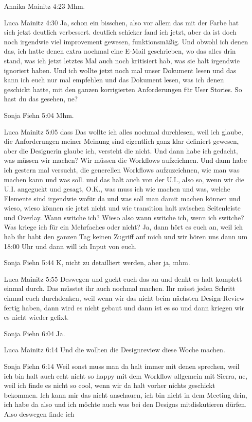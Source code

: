 Annika Mainitz   4:23
Mhm.

Luca Mainitz   4:30
Ja, schon ein bisschen, also vor allem das mit der Farbe hat sich jetzt deutlich verbessert.
deutlich schicker fand ich jetzt, aber da ist doch noch irgendwie viel improvement gewesen, funktionsmäßig. Und obwohl ich denen das, ich hatte denen extra nochmal eine E-Mail geschrieben, wo das alles drin stand, was ich jetzt letztes Mal auch noch kritisiert hab, was sie halt irgendwie ignoriert haben.
Und ich wollte jetzt noch mal unser Dokument lesen und das kann ich euch nur mal empfehlen und das Dokument lesen, was ich denen geschickt hatte, mit den ganzen korrigierten Anforderungen für User Stories. So hast du das gesehen, ne?

Sonja Fiehn   5:04
Mhm.

Luca Mainitz   5:05
dass
Das wollte ich alles nochmal durchlesen, weil ich glaube, die Anforderungen meiner Meinung sind eigentlich ganz klar definiert gewesen, aber die Designerin glaube ich, versteht die nicht. Und dann habe ich gedacht, was müssen wir machen? Wir müssen die Workflows aufzeichnen. Und dann habe ich gestern mal versucht, die generellen Workflows aufzuzeichnen, wie man was machen kann und was soll.
und das halt auch von der U.I., also so, wenn wir die U.I. angeguckt und gesagt, O.K., was muss ich wie machen und was, welche Elemente sind irgendwie wofür da und was soll man damit machen können und wieso, wieso können sie jetzt nicht und wie transition halt zwischen
Seitenleiste und Overlay. Wann switche ich? Wieso also wann switche ich, wenn ich switche? Was kriege ich für ein Mehrfaches oder nicht? Ja, dann hört es euch an, weil ich hab ihr habt den ganzen Tag keinen Zugriff auf mich und wir hören uns dann um 18:00 Uhr und dann will ich Input von euch.

Sonja Fiehn   5:44
K, nicht zu detailliert werden, aber ja, mhm.

Luca Mainitz   5:55
Deswegen und guckt euch das an und denkt es halt komplett einmal durch.
Das müsstet ihr auch nochmal machen. Ihr müsst jeden Schritt einmal euch durchdenken, weil wenn wir das nicht beim nächsten Design-Review fertig haben, dann wird es nicht gebaut und dann ist es so und dann kriegen wir es nicht wieder gefixt.

Sonja Fiehn   6:04
Ja.

Luca Mainitz   6:14
Und die wollten die Designreview diese Woche machen.

Sonja Fiehn   6:14
Weil sonst muss man da halt immer mit denen sprechen, weil ich bin halt auch echt nicht so happy mit dem Workflow allgemein mit Sierra, ne, weil ich finde es nicht so cool, wenn wir da halt vorher nichts geschickt bekommen. Ich kann mir das nicht anschauen, ich bin nicht in dem Meeting drin, ich habe da also und ich möchte auch was bei den Designs mitdiskutieren dürfen. Also deswegen finde ich

